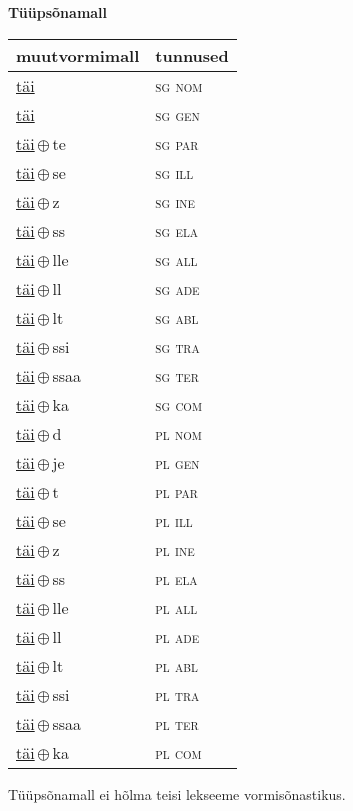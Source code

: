 

\vspace{3.5em}
\noindent \begin{minipage}{\textwidth}
\noindent \textbf{Tüüpsõnamall \,}\\

\begin{sideways}
\begin{tabular}{l l}
muutvormimall & tunnused \\
\hline
\underline{täi} & \textsc{ sg nom } \\
\underline{täi} & \textsc{ sg gen } \\
\underline{täi}\,$\oplus$\,te & \textsc{ sg par } \\
\underline{täi}\,$\oplus$\,se & \textsc{ sg ill } \\
\underline{täi}\,$\oplus$\,z & \textsc{ sg ine } \\
\underline{täi}\,$\oplus$\,ss & \textsc{ sg ela } \\
\underline{täi}\,$\oplus$\,lle & \textsc{ sg all } \\
\underline{täi}\,$\oplus$\,ll & \textsc{ sg ade } \\
\underline{täi}\,$\oplus$\,lt & \textsc{ sg abl } \\
\underline{täi}\,$\oplus$\,ssi & \textsc{ sg tra } \\
\underline{täi}\,$\oplus$\,ssaa & \textsc{ sg ter } \\
\underline{täi}\,$\oplus$\,ka & \textsc{ sg com } \\
\underline{täi}\,$\oplus$\,d & \textsc{ pl nom } \\
\underline{täi}\,$\oplus$\,je & \textsc{ pl gen } \\
\underline{täi}\,$\oplus$\,t & \textsc{ pl par } \\
\underline{täi}\,$\oplus$\,se & \textsc{ pl ill } \\
\underline{täi}\,$\oplus$\,z & \textsc{ pl ine } \\
\underline{täi}\,$\oplus$\,ss & \textsc{ pl ela } \\
\underline{täi}\,$\oplus$\,lle & \textsc{ pl all } \\
\underline{täi}\,$\oplus$\,ll & \textsc{ pl ade } \\
\underline{täi}\,$\oplus$\,lt & \textsc{ pl abl } \\
\underline{täi}\,$\oplus$\,ssi & \textsc{ pl tra } \\
\underline{täi}\,$\oplus$\,ssaa & \textsc{ pl ter } \\
\underline{täi}\,$\oplus$\,ka & \textsc{ pl com } \\
\end{tabular}
\end{sideways}
\label{tab:tüüpsõnamall-täi}

\end{minipage}

 
\vspace{1em}
\noindent Tüüpsõnamall  ei hõlma teisi lekseeme vormi\-sõnastikus.
